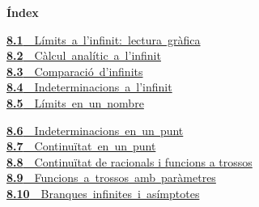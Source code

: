 \documentclass[11pt,a4paper]{article}
\begin{document}
\begin{tcolorbox}[colback=fmsurface,colframe=fmsurface,arc=3mm,left=4mm,right=4mm,top=2mm,bottom=2mm]
\small\textbf{Índex}\par\smallskip
\begin{minipage}[t]{0.49\linewidth}\small \mbox{\hyperlink{sec1}{\textbf{\color{fmgreen}8.1}\ \ Límits a l'infinit: lectura gràfica}}\\[3pt]
\mbox{\hyperlink{sec2}{\textbf{\color{fmgreen}8.2}\ \ Càlcul analític a l'infinit}}\\[3pt]
\mbox{\hyperlink{sec3}{\textbf{\color{fmgreen}8.3}\ \ Comparació d'infinits}}\\[3pt]
\mbox{\hyperlink{sec4}{\textbf{\color{fmgreen}8.4}\ \ Indeterminacions a l'infinit}}\\[3pt]
\mbox{\hyperlink{sec5}{\textbf{\color{fmgreen}8.5}\ \ Límits en un nombre}}\\[3pt]\end{minipage}\hfill\begin{minipage}[t]{0.49\linewidth}\small \mbox{\hyperlink{sec6}{\textbf{\color{fmgreen}8.6}\ \ Indeterminacions en un punt}}\\[3pt]
\mbox{\hyperlink{sec7}{\textbf{\color{fmgreen}8.7}\ \ Continuïtat en un punt}}\\[3pt]
\hyperlink{sec8}{\textbf{\color{fmgreen}8.8}\ \ Continuïtat de racionals i funcions a trossos}\\[3pt]
\mbox{\hyperlink{sec9}{\textbf{\color{fmgreen}8.9}\ \ Funcions a trossos amb paràmetres}}\\[3pt]
\mbox{\hyperlink{sec10}{\textbf{\color{fmgreen}8.10}\ \ Branques infinites i asímptotes}}\\[3pt]\end{minipage}
\end{tcolorbox}

\Needspace{5.7cm}
\end{document}
